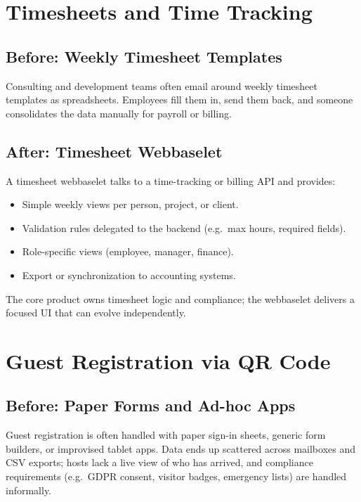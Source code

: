\section{Timesheets and Time Tracking}

\subsection*{Before: Weekly Timesheet Templates}
Consulting and development teams often email around weekly timesheet
templates as spreadsheets. Employees fill them in, send them back,
and someone consolidates the data manually for payroll or billing.

\subsection*{After: Timesheet Webbaselet}
A timesheet webbaselet talks to a time-tracking or billing API and
provides:
\begin{itemize}
  \item Simple weekly views per person, project, or client.
  \item Validation rules delegated to the backend (e.g.\ max hours,
        required fields).
  \item Role-specific views (employee, manager, finance).
  \item Export or synchronization to accounting systems.
\end{itemize}
The core product owns timesheet logic and compliance; the webbaselet
delivers a focused UI that can evolve independently.

\section{Guest Registration via QR Code}

\subsection*{Before: Paper Forms and Ad-hoc Apps}
Guest registration is often handled with paper sign-in sheets,
generic form builders, or improvised tablet apps. Data ends up
scattered across mailboxes and CSV exports; hosts lack a live
view of who has arrived, and compliance requirements (e.g.\ GDPR
consent, visitor badges, emergency lists) are handled informally.

